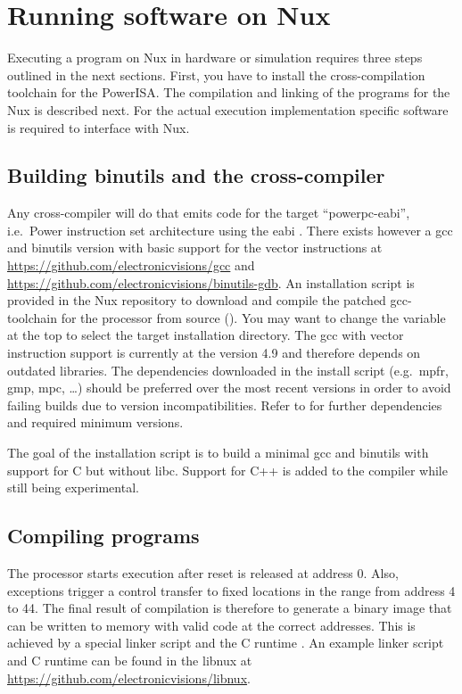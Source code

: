 \chapter{Running software on Nux}
\label{ch:usesw}

Executing a program on Nux in hardware or simulation requires three steps outlined in the next sections.
First, you have to install the cross-compilation toolchain for the PowerISA.
The compilation and linking of the programs for the Nux is described next.
For the actual execution implementation specific software is required to interface with Nux.


\section{Building binutils and the cross-compiler}
Any cross-compiler will do that emits code for the target ``powerpc-eabi'', i.e.\ Power instruction set architecture using the \gls{eabi} \citep{IBM1998}.
There exists however a gcc and binutils version with basic support for the vector instructions at \url{https://github.com/electronicvisions/gcc} and \url{https://github.com/electronicvisions/binutils-gdb}.
An installation script is provided in the Nux repository to download and compile the patched gcc-toolchain for the processor from source ().
You may want to change the  variable at the top to select the target installation directory.
The gcc with vector instruction support is currently at the version 4.9 and therefore depends on outdated libraries.
The dependencies downloaded in the install script (e.g.\ mpfr, gmp, mpc, \ldots) should be preferred over the most recent versions in order to avoid failing builds due to version incompatibilities.
Refer to \cite{installgcc} for further dependencies and required minimum versions.

The goal of the installation script is to build a minimal gcc and binutils with support for C but without libc.
Support for C++ is added to the compiler while still being experimental.


\section{Compiling programs}

The processor starts execution after reset is released at address 0.
Also, exceptions trigger a control transfer to fixed locations in the range from address 4 to 44.
The final result of compilation is therefore to generate a binary image that can be written to memory with valid code at the correct addresses.
This is achieved by a special linker script  and the C runtime .
An example linker script and C runtime can be found in the libnux at \url{https://github.com/electronicvisions/libnux}.


